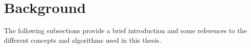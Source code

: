 \section{Background}
\label{sec:background}
The following subsections provide a brief introduction and some references to the different concepts and algorithms used in this thesis.









